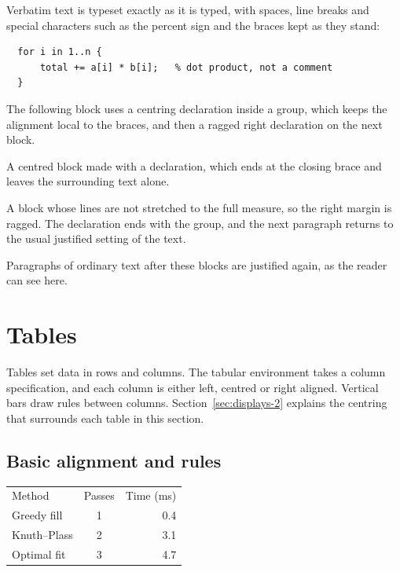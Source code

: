 \documentclass{article}
\begin{document}
Verbatim text is typeset exactly as it is typed, with spaces, line breaks and special
characters such as the percent sign and the braces kept as they stand:

\begin{verbatim}
  for i in 1..n {
      total += a[i] * b[i];   % dot product, not a comment
  }
\end{verbatim}

The following block uses a centring declaration inside a group, which keeps the
alignment local to the braces, and then a ragged right declaration on the next block.

{\centering A centred block made with a declaration, which ends at the closing
brace and leaves the surrounding text alone.\par}

{\raggedright A block whose lines are not stretched to the full measure, so the
right margin is ragged. The declaration ends with the group, and the next paragraph
returns to the usual justified setting of the text.\par}

Paragraphs of ordinary text after these blocks are justified again, as the reader can
see here.

\section{Tables}\label{sec:tables-2}

Tables set data in rows and columns. The tabular environment takes a column
specification, and each column is either left, centred or right aligned. Vertical bars
draw rules between columns. Section~\ref{sec:displays-2} explains the centring that surrounds each table in
this section.

\subsection{Basic alignment and rules}\label{sec:tables-basic-2}

\begin{center}
\begin{tabular}{l c r}
Method & Passes & Time (ms) \\
Greedy fill      & 1 & 0.4 \\
Knuth--Plass     & 2 & 3.1 \\
Optimal fit      & 3 & 4.7 \\
\end{tabular}
\end{center}
\end{document}
